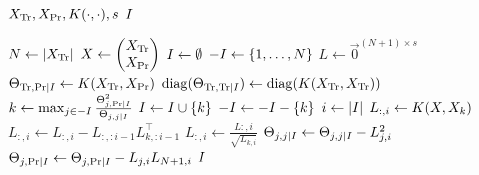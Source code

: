 \begin{algorithmic}[1]
  \REQUIRE \( X_{\text{Tr}}, X_{\text{Pr}}, K(\cdot, \cdot), s \)
  \ENSURE \( I \)

  \STATE \( N \gets \lvert X_{\text{Tr}} \rvert \)
  \STATE \(
    X \gets
    \begin{pmatrix}
      X_{\text{Tr}} \\
      X_{\text{Pr}}
    \end{pmatrix}
  \)
  \STATE \( I \gets \emptyset \)
  \STATE \( -I \gets \{ 1, \dotsc, N \} \)
  \STATE \( L \gets \vec{0}^{(N + 1) \times s} \)
  \STATE \(
    \Theta_{\text{Tr}, \text{Pr} \mid I} \gets
    K(X_{\text{Tr}}, X_{\text{Pr}})
  \)
  \STATE \(
    \operatorname{diag}(\Theta_{\text{Tr}, \text{Tr} \mid I}) \gets
    \operatorname{diag}(K(X_{\text{Tr}}, X_{\text{Tr}}))
  \)
    \STATE \(
      k \gets \max_{j \in -I}
      \frac{\Theta_{j, \text{Pr} \mid I}^2}{\Theta_{j, j \mid I}}
    \)
    \STATE \( I \gets I \cup \{ k \} \)
    \STATE \( -I \gets -I - \{ k \} \)
    \STATE \( i \gets \lvert I\rvert \)
    \STATE \( L_{:, i} \gets K(X, X_k) \)
    \STATE \( L_{:, i} \gets L_{:, i} - L_{:, :i - 1} L_{k, :i - 1}^{\top} \)
    \STATE \( L_{:, i} \gets \frac{L{:, i}}{\sqrt{L_{k, i}}} \)
      \STATE \(
        \Theta_{j, j \mid I} \gets
        \Theta_{j, j \mid I} -
        L_{j, i}^2
      \)
      \STATE \(
        \Theta_{j, \text{Pr} \mid I} \gets
        \Theta_{j, \text{Pr} \mid I} -
        L_{j, i} L_{N + 1, i}
      \)
    \ENDFOR
  \ENDWHILE
  \RETURN \( I \)
\end{algorithmic}
